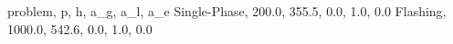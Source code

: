 problem, p, h, a_g, a_l, a_e
Single-Phase, 200.0, 355.5, 0.0, 1.0, 0.0
Flashing, 1000.0, 542.6, 0.0, 1.0, 0.0